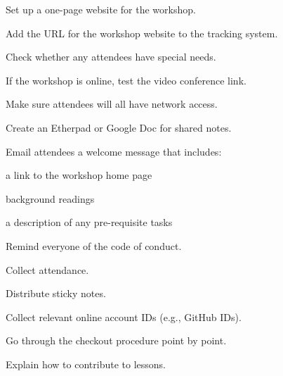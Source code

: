 \begin{genumerate}

\item
  Set up a one-page website for the workshop.

\item
  Add the URL for the workshop website to the tracking system.

\item
  Check whether any attendees have special needs.

\item
  If the workshop is online, test the video conference link.

\item
  Make sure attendees will all have network access.

\item
  Create an Etherpad or Google Doc for shared notes.

\item
  Email attendees a welcome message that includes:

  \begin{gitemize}

    \item
      a link to the workshop home page

    \item
      background readings

    \item
      a description of any pre-requisite tasks

  \end{gitemize}

\end{genumerate}


\begin{genumerate}

\item
  Remind everyone of the code of conduct.

\item
  Collect attendance.

\item
  Distribute sticky notes.

\item
  Collect relevant online account IDs (e.g., GitHub IDs).

\item
  Go through the checkout procedure point by point.

\item
  Explain how to contribute to lessons.

\end{genumerate}


